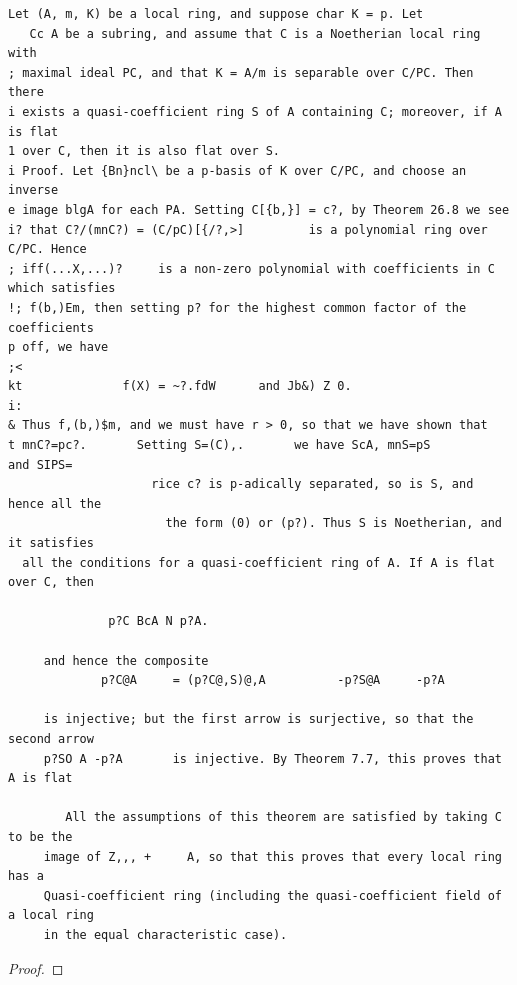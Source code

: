 \begin{theorem}\label{mcrt-auto-theorem-29-5}\uses{}
\begin{verbatim}
Let (A, m, K) be a local ring, and suppose char K = p. Let
   Cc A be a subring, and assume that C is a Noetherian local ring with
; maximal ideal PC, and that K = A/m is separable over C/PC. Then there
i exists a quasi-coefficient ring S of A containing C; moreover, if A is flat
1 over C, then it is also flat over S.
i Proof. Let {Bn}ncl\ be a p-basis of K over C/PC, and choose an inverse
e image blgA for each PA. Setting C[{b,}] = c?, by Theorem 26.8 we see
i? that C?/(mnC?) = (C/pC)[{/?,>]         is a polynomial ring over C/PC. Hence
; iff(...X,...)?     is a non-zero polynomial with coefficients in C which satisfies
!; f(b,)Em, then setting p? for the highest common factor of the coefficients
p off, we have
;<
kt              f(X) = ~?.fdW      and Jb&) Z 0.
i:
& Thus f,(b,)$m, and we must have r > 0, so that we have shown that
t mnC?=pc?.       Setting S=(C),.       we have ScA, mnS=pS          and SIPS=
                    rice c? is p-adically separated, so is S, and hence all the
                      the form (0) or (p?). Thus S is Noetherian, and it satisfies
  all the conditions for a quasi-coefficient ring of A. If A is flat over C, then

              p?C BcA N p?A.

     and hence the composite
             p?C@A     = (p?C@,S)@,A          -p?S@A     -p?A

     is injective; but the first arrow is surjective, so that the second arrow
     p?SO A -p?A       is injective. By Theorem 7.7, this proves that A is flat

        All the assumptions of this theorem are satisfied by taking C to be the
     image of Z,,, +     A, so that this proves that every local ring has a
     Quasi-coefficient ring (including the quasi-coefficient field of a local ring
     in the equal characteristic case).
\end{verbatim}
\end{theorem}
\begin{proof}
\notready
\end{proof}


